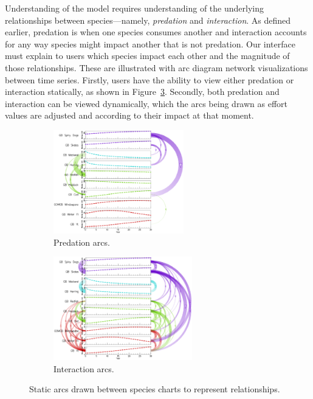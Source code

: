 Understanding of the model requires understanding of the underlying relationships between species---namely, \textit{predation} and \textit{interaction}.  As defined earlier, predation is when one species consumes another and interaction accounts for any way species might impact another that is not predation.  Our interface must explain to users which species impact each other and the magnitude of those relationships.  These are illustrated with arc diagram network visualizations between time series.  Firstly, users have the ability to view either predation or interaction statically, as shown in Figure~\ref{fig:betweenSpeciesArcs}.  Secondly, both predation and interaction can be viewed dynamically, which the arcs being drawn as effort values are adjusted and according to their impact at that moment.



\begin{figure}
\centering
	\begin{subfigure}[b]{0.48\textwidth}
		\centering
		\includegraphics[height=4.5cm]{figures/eps/arcs_predation.eps}
		\caption{Predation arcs.}
		\label{fig:arcsPredation}
	\end{subfigure}	
	\begin{subfigure}[b]{0.48\textwidth}
		\centering
		\includegraphics[height=4.5cm]{figures/eps/arcs_interaction.eps}
		\caption{Interaction arcs.}
		\label{fig:arcsInteraction}
	\end{subfigure}
	\caption{Static arcs drawn between species charts to represent relationships.}
	\label{fig:betweenSpeciesArcs}
\end{figure}

